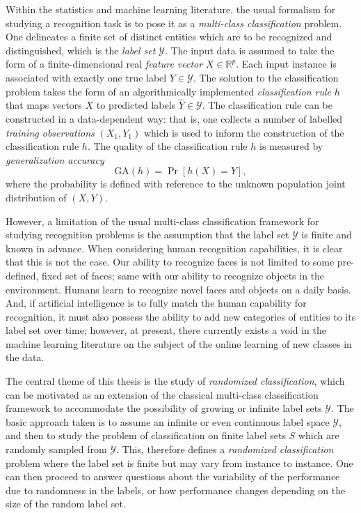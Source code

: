 Within the statistics and machine learning literature, the usual
formalism for studying a recognition task is to pose it as a
\emph{multi-class classification} problem.  One delineates a finite
set of distinct entities which are to be recognized and distinguished,
which is the \emph{label set} $\mathcal{Y}$.  The input data is
assumed to take the form of a finite-dimensional real \emph{feature
  vector} $X \in \mathbb{R}^p$.  Each input instance is associated
with exactly one true label $Y \in \mathcal{Y}$.  The solution to the
classification problem takes the form of an algorithmically
implemented \emph{classification rule} $h$ that maps vectors $X$ to
predicted labels $\hat{Y} \in \mathcal{Y}$.  The classification rule
can be constructed in a data-dependent way: that is, one collects a
number of labelled \emph{training observations} $(X_1, Y_1)$ which is
used to inform the construction of the classification rule $h$.  The
quality of the classification rule $h$ is measured by \emph{generalization accuracy}
\[
\text{GA}(h) = \Pr[h(X) = Y],
\]
where the probability is defined with reference to the unknown
population joint distribution of $(X, Y)$.  

However, a limitation of the usual multi-class classification
framework for studying recognition problems is the assumption that the
label set $\mathcal{Y}$ is finite and known in advance.  When
considering human recognition capabilities, it is clear that this is
not the case.  Our ability to recognize faces is not limited to some
pre-defined, fixed set of faces; same with our ability to recognize
objects in the environment.  Humans learn to recognize novel faces and
objects on a daily basis.  And, if artificial intelligence is to fully
match the human capability for recognition, it must also possess the
ability to add new categories of entities to its label set over time;
however, at present, there currently exists a void in the machine
learning literature on the subject of the online learning of new
classes in the data.

The central theme of this thesis is the study of \emph{randomized
  classification}, which can be motivated as an extension of the
classical multi-class classification framework to accommodate the
possibility of growing or infinite label sets $\mathcal{Y}$. The basic
approach taken is to assume an infinite or even continuous label space
$\mathcal{Y}$, and then to study the problem of classification on
finite label sets $S$ which are randomly sampled from $\mathcal{Y}.$
This, therefore defines a \emph{randomized classification} problem
where the label set is finite but may vary from instance to instance.
One can then proceed to answer questions about the variability of the
performance due to randomness in the labels, or how performance
changes depending on the size of the random label set.


